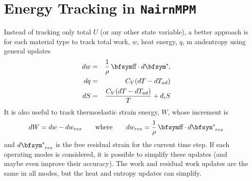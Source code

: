 \documentclass[11pt]{book}
\begin{document}
\section{Energy Tracking in {\tt NairnMPM}\label{EnergyUpdates}}

Instead of tracking only total $U$ (or any other state variable), a better approach is for each material type to track total work, $w$,  heat energy, $q$, m andentropy using general updates
\begin{eqnarray}
           dw & = & {1\over \rho}\thinspace \st\cdot d\et, \\
           dq & = & C_V (dT - dT_{ad})  \\
           dS & = & {C_V (dT - dT_{ad})\over T} + d_iS
\end{eqnarray}
It is also useful to track thermoelastic strain energy, $W$, whose increment is
\begin{equation}
     dW = dw - dw_{res} \qquad {\rm where} \qquad dw_{res} = {1\over \rho}\thinspace \st\cdot d\et_{res}
\end{equation}
and $d\et_{res}$ is the free residual strain for the current time step.
If each operating modes is considered, it is possible to simplify these updates (and maybe even improve their accuracy). The work and residual work updates are the same in all modes, but the heat and entropy updates can simplify.
\end{document}
